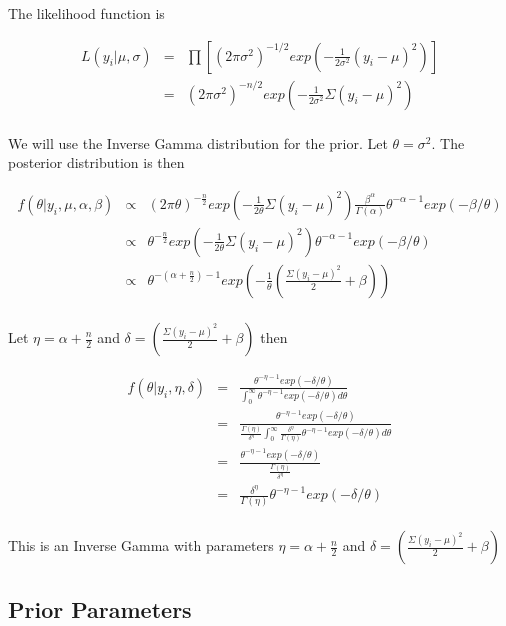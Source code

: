 \documentclass[12pt]{article}
\begin{document}
\noindent The likelihood function is

\begin{eqnarray*}
L(y_i|\mu,\sigma) &=& \prod\left[(2\pi\sigma^2)^{-1/2}exp\left(-\frac{1}{2\sigma^2}(y_i-\mu)^2\right)\right] \\
&=& (2\pi\sigma^2)^{-n/2}exp\left(-\frac{1}{2\sigma^2}\Sigma(y_i-\mu)^2\right) \\
\end{eqnarray*}

\noindent We will use the Inverse Gamma distribution for the prior.  Let $\theta=\sigma^2$.  The posterior distribution is then

\begin{eqnarray*}
f(\theta|y_i,\mu,\alpha,\beta) &\propto& (2\pi\theta)^{-\frac{n}{2}}exp\left(-\frac{1}{2\theta}\Sigma(y_i-\mu)^2\right)\frac{\beta^\alpha}{\Gamma(\alpha)}\theta^{-\alpha-1}exp(-\beta/\theta) \\
&\propto& \theta^{-\frac{n}{2}}exp\left(-\frac{1}{2\theta}\Sigma(y_i-\mu)^2\right)\theta^{-\alpha-1}exp(-\beta/\theta) \\
&\propto& \theta^{-(\alpha+\frac{n}{2})-1}exp\left(-\frac{1}{\theta}\left(\frac{\Sigma(y_i-\mu)^2}{2}+\beta\right)\right) \\
\end{eqnarray*}

\noindent Let $\eta=\alpha+\frac{n}{2}$ and $\delta=\left(\frac{\Sigma(y_i-\mu)^2}{2}+\beta\right)$ then

\begin{eqnarray*}
f(\theta|y_i,\eta,\delta) &=& \frac{\theta^{-\eta-1}exp(-\delta/\theta)}{\int_0^\infty\theta^{-\eta-1}exp(-\delta/\theta)d\theta} \\
&=& \frac{\theta^{-\eta-1}exp(-\delta/\theta)}{\frac{\Gamma(\eta)}{\delta^\eta}\int_0^\infty\frac{\delta^\eta}{\Gamma(\eta)}\theta^{-\eta-1}exp(-\delta/\theta)d\theta} \\
&=& \frac{\theta^{-\eta-1}exp(-\delta/\theta)}{\frac{\Gamma(\eta)}{\delta^\eta}} \\
&=& \frac{\delta^\eta}{\Gamma(\eta)}\theta^{-\eta-1}exp(-\delta/\theta) \\
\end{eqnarray*}

\noindent This is an Inverse Gamma with parameters $\eta=\alpha+\frac{n}{2}$ and $\delta=\left(\frac{\Sigma(y_i-\mu)^2}{2}+\beta\right)$

\subsection{Prior Parameters}
\end{document}
